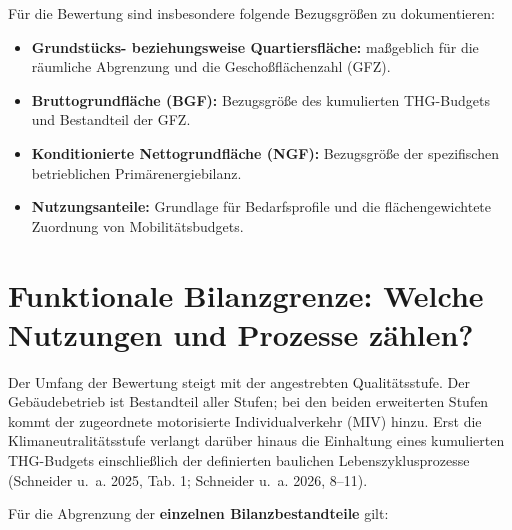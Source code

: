 \documentclass[
  ngerman,
  a4paper,
  DIV=11]{scrreprt}
\providecommand{\tightlist}{%
  \setlength{\itemsep}{0pt}\setlength{\parskip}{0pt}}
\begin{document}
Für die Bewertung sind insbesondere folgende Bezugsgrößen zu
dokumentieren:

\begin{itemize}
\tightlist
\item
  \textbf{Grundstücks- beziehungsweise Quartiersfläche:} maßgeblich für
  die räumliche Abgrenzung und die Geschoßflächenzahl (GFZ).
\item
  \textbf{Bruttogrundfläche (BGF):} Bezugsgröße des kumulierten
  THG-Budgets und Bestandteil der GFZ.
\item
  \textbf{Konditionierte Nettogrundfläche (NGF):} Bezugsgröße der
  spezifischen betrieblichen Primärenergiebilanz.
\item
  \textbf{Nutzungsanteile:} Grundlage für Bedarfsprofile und die
  flächengewichtete Zuordnung von Mobilitätsbudgets.
\end{itemize}

\section{Funktionale Bilanzgrenze: Welche Nutzungen und Prozesse
zählen?}\label{funktionale-bilanzgrenze-welche-nutzungen-und-prozesse-zuxe4hlen}

Der Umfang der Bewertung steigt mit der angestrebten Qualitätsstufe. Der
Gebäudebetrieb ist Bestandteil aller Stufen; bei den beiden erweiterten
Stufen kommt der zugeordnete motorisierte Individualverkehr (MIV) hinzu.
Erst die Klimaneutralitätsstufe verlangt darüber hinaus die Einhaltung
eines kumulierten THG-Budgets einschließlich der definierten baulichen
Lebenszyklusprozesse (Schneider u.~a. 2025, Tab. 1; Schneider u.~a.
2026, 8--11).

Für die Abgrenzung der \textbf{einzelnen Bilanzbestandteile} gilt:
\end{document}
